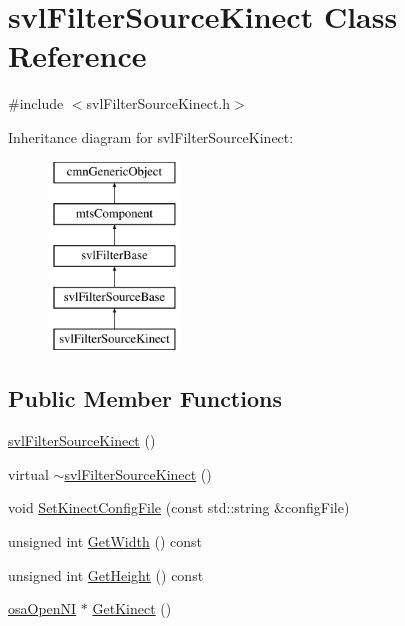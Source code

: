 \hypertarget{classsvl_filter_source_kinect}{}\section{svl\+Filter\+Source\+Kinect Class Reference}
\label{classsvl_filter_source_kinect}


{\ttfamily \#include $<$svl\+Filter\+Source\+Kinect.\+h$>$}

Inheritance diagram for svl\+Filter\+Source\+Kinect\+:\begin{figure}[H]
\begin{center}
\leavevmode
\includegraphics[height=5.000000cm]{de/d1a/classsvl_filter_source_kinect}
\end{center}
\end{figure}
\subsection*{Public Member Functions}
\begin{DoxyCompactItemize}
\item 
\hyperlink{classsvl_filter_source_kinect_aa477abf2df88dd5840674b6b99da6520}{svl\+Filter\+Source\+Kinect} ()
\item 
virtual \hyperlink{classsvl_filter_source_kinect_a30fe905e03ba4c84e6da060a167d9641}{$\sim$svl\+Filter\+Source\+Kinect} ()
\item 
void \hyperlink{classsvl_filter_source_kinect_ae70437314bf55cb74fc70d1820ee0576}{Set\+Kinect\+Config\+File} (const std\+::string \&config\+File)
\item 
unsigned int \hyperlink{classsvl_filter_source_kinect_aeb40cbf785d39a6d7a16d3ab428e6bbb}{Get\+Width} () const 
\item 
unsigned int \hyperlink{classsvl_filter_source_kinect_a9d6710ea61786113d5075752d0fd85b3}{Get\+Height} () const 
\item 
\hyperlink{classosa_open_n_i}{osa\+Open\+N\+I} $\ast$ \hyperlink{classsvl_filter_source_kinect_aabd8d15d05fc59a0413654816bf57198}{Get\+Kinect} ()
\end{DoxyCompactItemize}

